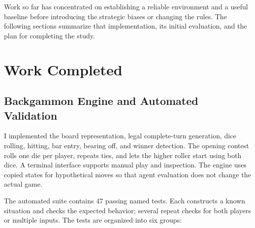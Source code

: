 \documentclass[12pt,twoside]{article}
\begin{document}
Work so far has concentrated on establishing a reliable environment and a useful
baseline before introducing the strategic biases or changing the rules. The
following sections summarize that implementation, its initial evaluation, and
the plan for completing the study.

\section{Work Completed}

\subsection{Backgammon Engine and Automated Validation}

I implemented the board representation, legal complete-turn generation, dice
rolling, hitting, bar entry, bearing off, and winner detection. The opening
contest rolls one die per player, repeats ties, and lets the higher roller
start using both dice. A terminal interface supports manual play and inspection.
The engine uses copied states for hypothetical moves so that agent evaluation
does not change the actual game.

The automated suite contains 47 passing named tests. Each constructs a known
situation and checks the expected behavior; several repeat checks for both
players or multiple inputs. The tests are organized into six groups:
\end{document}
